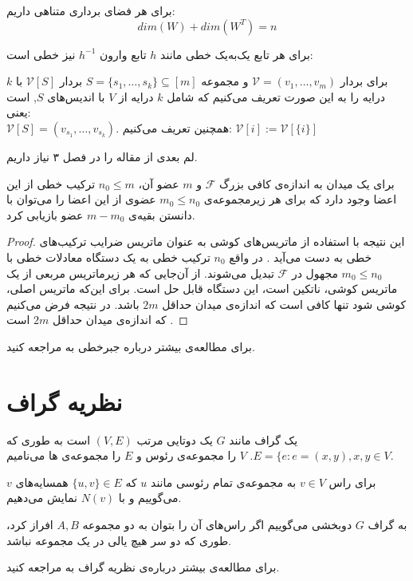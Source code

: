 \begin{theorem}
	برای هر فضای برداری متناهی داریم:
	$$dim(W) + dim(W^T) = n$$
\end{theorem}
\begin{remark}
	برای هر تابع یک‌به‌یک خطی مانند
	$h$
	تابع وارون 
	$h^{-1}$
	نیز خطی است:
\end{remark}

برای بردار
$\mathcal{V} = (v_1, \ldots, v_m)$ 
و مجموعه
$S = \{s_1, \ldots, s_k\} \subseteq [m]$
بردار
$\mathcal{V} [S]$ 
با 
$k$ درایه 
را به این صورت تعریف می‌کنیم که شامل
$k$ 
درایه از
$V$ 
با اندیس‌های
$S$, 
است یعنی:\\
$\mathcal{V} [S] = (v_{s_1}, \ldots, v_{s_k})$.
همچنین تعریف می‌کنیم:
$\mathcal{V} [i] := \mathcal{V} [{\{i\}}]$

لم بعدی از مقاله
\cite{pliable2015paper}
را در فصل ۳ نیاز داریم.
\begin{lemma}
	\label{lemma:pliable20151}
	برای یک میدان به اندازه‌ی کافی بزرگ
	$\mathcal{F}$
	و
	$m$
	عضو آن،
	$n_0 \leq m$
	ترکیب خطی از این اعضا وجود دارد که برای هر زیرمجموعه‌ی
	$m_0 \leq n_0$
	عضوی از این اعضا را می‌توان با دانستن بقیه‌ی
	$m - m_0$
	عضو بازیابی کرد.
\end{lemma}
\begin{proof}
این نتیجه با استفاده از ماتریس‌های کوشی به عنوان ماتریس ضرایب ترکیب‌های خطی به دست می‌آید
\cite{Blmer1995AnXE}.
در واقع
$n_0$
ترکیب خطی به یک دستگاه معادلات خطی با
$m_0 \leq n_0$
مجهول در
$\mathcal{F}$
تبدیل می‌شوند. از آن‌جایی که هر زیرماتریس مربعی از یک ماتریس کوشی، ناتکین است، این دستگاه قابل حل است. برای این‌که ماتریس اصلی، کوشی شود تنها کافی است که اندازه‌ی میدان حداقل
$2m$
باشد. در نتیجه فرض می‌کنیم که اندازه‌ی میدان حداقل
$2m$
است
\cite{pliable2015paper}.
\end{proof}
	برای مطالعه‌ی بیشتر درباره جبرخطی به
\cite{sheldon}
مراجعه کنید.
\section{نظریه گراف}
\begin{definition}
یک گراف مانند
$G$
یک دوتایی مرتب
$(V, E)$
است به طوری که
$E = \{e: e = (x, y), x, y \in V$.
 $V$
را مجموعه‌ی رئوس و
$E$
را مجموعه‌ی 
ها
می‌نامیم.

برای راس
$v\in V$
به مجمو‌عه‌ی تمام رئوسی مانند
  $u$ 
  که
  $\{u,v\}\in E$ 
  همسایه‌های 
  $v$
  می‌گوییم و با
  $N(v)$
  نمایش می‌دهیم.
  
به گراف
$G$
دوبخشی می‌گوییم اگر راس‌های آن را بتوان به دو مجموعه 
$A, B$
افراز کرد، طوری که دو سر هیچ یالی در یک مجموعه نباشد.
\end{definition}
	برای مطالعه‌ی بیشتر درباره‌ی نظریه گراف به
\cite{west}
مراجعه کنید.

